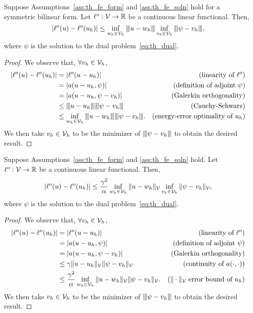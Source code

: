 \begin{proposition}
  \label{prop:th_output_sym}
  Suppose Assumptions~\eqref{ass:th_fe_form} and \eqref{ass:th_fe_soln} hold for a symmetric bilinear form. Let $\ell^o: \mathcal{V} \to \mathbb{R}$ be a continuous linear functional. Then,
\begin{equation*}
  |\ell^o(u) - \ell^o(u_h)| \leq
  \inf_{w_h \in \mathcal{V}_h} |\kern-1pt|\kern-1pt| u - w_h |\kern-1pt|\kern-1pt| \inf_{v_h \in \mathcal{V}_h} |\kern-1pt|\kern-1pt| \psi - v_h |\kern-1pt|\kern-1pt|,
\end{equation*}
where $\psi$ is the solution to the dual problem~\ref{eq:th_dual}.
\begin{proof}
  We observe that, $\forall v_h \in \mathcal{V}_h$, 
\begin{align*}
  |\ell^o(u) - \ell^o(u_h)|
  &= |\ell^o(u - u_h)| & \text{(linearity of $\ell^o$)} \\
  &= |a(u-u_h,\psi)| & \text{(definition of adjoint $\psi$)} \\
  &= |a(u-u_h,\psi-v_h)| & \text{(Galerkin orthogonality)} \\
  &\leq |\kern-1pt|\kern-1pt|  u - u_h  |\kern-1pt|\kern-1pt||\kern-1pt|\kern-1pt|  \psi - v_h  |\kern-1pt|\kern-1pt| & \text{(Cauchy-Schwarz)} \\
  &\leq \inf_{w_h \in \mathcal{V}_h} |\kern-1pt|\kern-1pt|  u - w_h  |\kern-1pt|\kern-1pt||\kern-1pt|\kern-1pt|  \psi - v_h  |\kern-1pt|\kern-1pt|. & \text{(energy-error optimality of $u_h$)}
\end{align*}
We then take $v_h \in \mathcal{V}_h$ to be the minimizer of $|\kern-1pt|\kern-1pt| \psi - v_h |\kern-1pt|\kern-1pt|$ to obtain the desired result.
\end{proof}
\end{proposition}

\begin{proposition}
  \label{prop:th_output_nonsym}
   Suppose Assumptions~\eqref{ass:th_fe_form} and \eqref{ass:th_fe_soln} hold. Let $\ell^o: \mathcal{V} \to \mathbb{R}$ be a continuous linear functional.  Then,
\begin{equation*}
  |\ell^o(u) - \ell^o(u_h)|
  \leq \frac{\gamma^2}{\alpha} \inf_{w_h \in \mathcal{V}_h} \| u - w_h \|_{\mathcal{V}} \inf_{v_h \in \mathcal{V}_h} \| \psi - v_h \|_{\mathcal{V}},
\end{equation*}
where $\psi$ is the solution to the dual problem~\ref{eq:th_dual}.
\begin{proof}
  We observe that, $\forall v_h \in \mathcal{V}_h$, 
  \begin{align*}
    |\ell^o(u) - \ell^o(u_h)|
    &= |\ell^o(u - u_h)| & \text{(linearity of $\ell^o$)} \\
    &= |a(u-u_h,\psi)| & \text{(definition of adjoint $\psi$)} \\
    &= |a(u-u_h,\psi-v_h)| & \text{(Galerkin orthogonality)} \\
    &\leq \gamma \| u - u_h \|_{\mathcal{V}} \| \psi - v_h \|_{\mathcal{V}} & \text{(continuity of $a(\cdot,\cdot)$)} \\
    &\leq \frac{\gamma^2}{\alpha} \inf_{w_h \in \mathcal{V}_h} \| u - w_h \|_{\mathcal{V}} \| \psi - v_h \|_{\mathcal{V}}. & \text{($\| \cdot \|_{\mathcal{V}}$ error bound of $u_h$)}
  \end{align*}
  We then take $v_h \in \mathcal{V}_h$ to be the minimizer of $|\kern-1pt|\kern-1pt| \psi - v_h |\kern-1pt|\kern-1pt|$ to obtain the desired result.
\end{proof}
\end{proposition}

